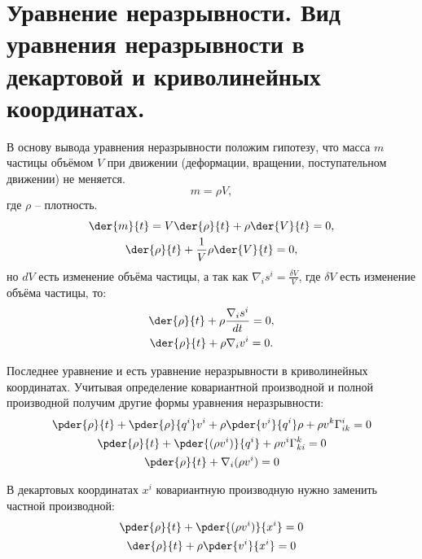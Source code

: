 \chapter{Уравнение неразрывности. Вид уравнения неразрывности в декартовой и
криволинейных координатах.}

В основу вывода уравнения неразрывности положим гипотезу, что масса \( m \)
частицы объёмом \( V \) при движении (деформации, вращении, поступательном
движении) не меняется.
\[
    m = \rho V,
\]
где \( \rho \) -- плотность.
\begin{gather*}
    \der{m}{t} =V \der{\rho }{t}+ \rho \der{V}{t} = 0,\\
    \der{\rho }{t}+ \frac{1}{V} \rho \der{V}{t} = 0,
\end{gather*}
но \( dV \) есть изменение объёма частицы, а так как
\( \nabla_is^i = \frac{\delta V}{V} \), где \( \delta V \) есть изменение
объёма частицы, то:
\begin{gather*}
    \der{\rho }{t}+ \rho \frac{\nabla_is^i}{dt} = 0, \\ 
    \der{\rho }{t}+ \rho {\nabla_iv^i } = 0.
\end{gather*}

Последнее уравнение и есть уравнение неразрывности в криволинейных координатах.
Учитывая определение ковариантной производной и полной производной получим
другие формы уравнения неразрывности:
\begin{gather*}
    \pder{\rho }{t} + 
    \pder{\rho }{q^i} v^i + 
    \rho \pder{v^i }{q^i} \rho  + 
    \rho v^k \Gamma^i_{ik} = 0 \\
    \pder{\rho }{t} + 
    \pder{(\rho v^i) }{q^i}   + 
    \rho v^i \Gamma^k_{ki} = 0 \\
    \pder{\rho }{t} + 
    \nabla_i(\rho v^i) = 0
\end{gather*}

В декартовых координатах \( x^i \) ковариантную производную нужно заменить
частной производной:
\begin{gather*}
    \pder{\rho }{t} + 
    \pder{(\rho v^i)}{x^i} = 0 \\
    \der{\rho }{t} + 
    \rho\pder{ v^i}{x^i} = 0    
\end{gather*}       


\newpage
